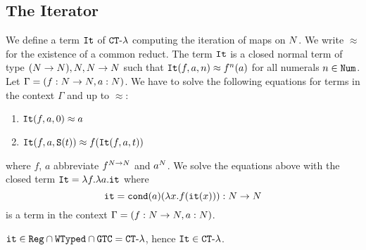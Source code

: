 %




\subsection{The Iterator}
\label{subsection-iterator}
\begin{Eg}
We define a term ${\tt It}$ of  ${ {\tt CT}\mbox{-}\lambda}$ computing the iteration of maps on ${N}$.
We write $\approx$ for
the existence of a common reduct.
The term ${\tt It}$ is a closed normal term of type $({N} \rightarrow {N}), {N},{N} \rightarrow {N}$ such 
that ${\tt It}(f,a,n) \approx f^n(a)$ for all numerals $n \in {\tt Num}$. 
Let $\Gamma = (f:{N} \rightarrow {N}, a:{N})$. 
We have to solve the following equations for terms in the context $\Gamma$
and up to $\approx$:

\begin{enumerate}
\item
${\tt It}(f,a,0) \approx a$ 
\item
${\tt It}(f,a,{\tt S} (t)) \approx f({\tt It}(f,a,t))$
\end{enumerate}

where $f$, $a$ abbreviate $f^{{N}\rightarrow{N}}$ and $a^{N}$.
We solve the equations above with the closed term ${\tt It} = \lambda f. \lambda a.{\tt it}$
where 
$$
{\tt it} = {\tt cond} (a)(\lambda x.f({\tt it}(x))):{N} \rightarrow {N}
$$ 
is a term in the context $\Gamma = (f:{N} \rightarrow {N}, a:{N})$.
\end{Eg}

\begin{proposition}
\label{proposition-iterator-in-CT-lambda}
${\tt it} \in {\tt Reg} \cap {\tt WTyped} \cap {\tt GTC} = { {\tt CT}\mbox{-}\lambda}$, 
hence ${\tt It} \in { {\tt CT}\mbox{-}\lambda}$.
\end{proposition}

